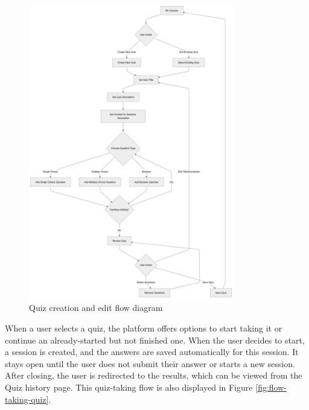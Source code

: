 \begin{figure}[H]
    \centering
    \includegraphics[width=0.8\textwidth, keepaspectratio]{figures/flow-quiz-creation-and-edit.png}
    \caption{Quiz creation and edit flow diagram}
    \label{fig:flow-quiz-creation-and-edit}
\end{figure}

When a user selects a quiz, the platform offers options to start taking it or continue an already-started but not finished one. When the user decides to start, a session is created, and the answers are saved automatically for this session. It stays open until the user does not submit their answer or starts a new session. After closing, the user is redirected to the results, which can be viewed from the Quiz history page. This quiz-taking flow is also displayed in Figure \ref{fig:flow-taking-quiz}.

